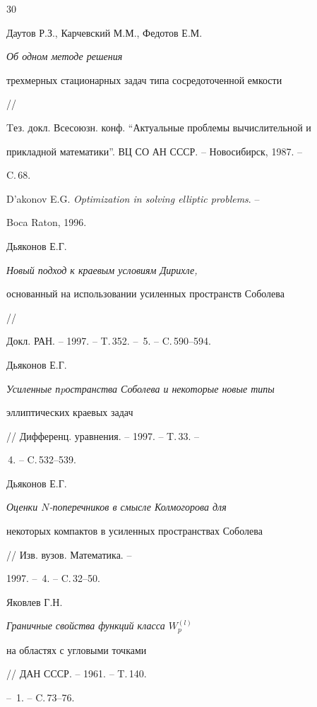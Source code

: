 \begin{thebibliography}{30}


Даутов Р.З., Карчевский М.М., Федотов Е.М. {\em Об одном методе решения


трехмерных стационарных задач типа сосредоточенной емкости} // 


Tез. докл. Всесоюзн. конф. ``Актуальные проблемы вычислительной и


прикладной математики''. ВЦ СО АН СССР. -- Новосибирск, 1987. --


C.\,68.







D'akonov E.G. {\em Optimization in solving elliptic problems}. --


Boca Raton, 1996.







Дьяконов Е.Г. {\em Новый подход к краевым условиям Дирихле,


основанный на использовании усиленных пространств Соболева} //


Докл. РАН. -- 1997. -- T.\,352. -- \No\,5. -- C.\,590--594.







Дьяконов Е.Г. {\em Усиленные пpостранства Соболева и некоторые новые типы


эллиптических краевых задач} // Дифференц. уравнения. -- 1997. -- T.\,33. --


\No\,4. -- C.\,532--539.







Дьяконов Е.Г. {\em Оценки $N$-поперечников в смысле Колмогорова для 


некоторых компактов в усиленных пространствах Соболева}


// Изв. вузов. Математика. --


1997. -- \No\,4. -- C.\,32--50.







Яковлев Г.Н. {\em Граничные свойства функций класса $W_p^{(l)}$


на областях с угловыми точками} // ДАН СССР. -- 1961. -- T.\,140.


-- \No\,1. -- C.\,73--76.






\end{thebibliography}
